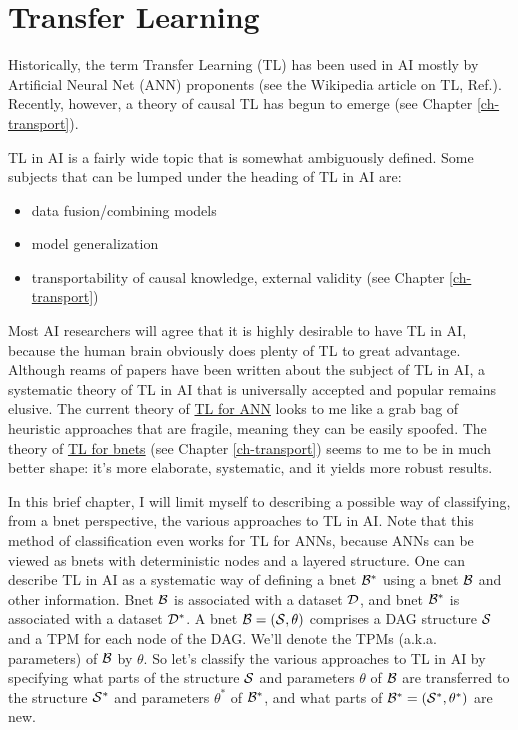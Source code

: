 \chapter{Transfer Learning}
\label{ch-transfer}

Historically,
the term Transfer Learning (TL)
has been used in AI mostly by Artificial Neural Net (ANN)
proponents (see the Wikipedia article on TL,
 Ref.\cite{wiki-TL}).
Recently, however,
 a theory of causal TL
has begun to emerge
(see Chapter \ref{ch-transport}).

TL in AI is a
fairly wide topic that 
is somewhat ambiguously defined.
Some subjects that can be lumped
under the heading of TL in AI are:
\begin{itemize}
\item data fusion/combining models
\item model generalization
\item transportability of 
causal knowledge, external validity
(see Chapter \ref{ch-transport})
\end{itemize}


Most AI researchers
will agree that it is highly desirable 
to have TL in AI, because the human 
brain obviously does  plenty of TL
to great advantage.
Although reams of papers 
have been written about the subject of TL in AI,
a systematic theory of TL in AI
that is universally accepted and popular
remains elusive. The current
theory of \ul{TL for ANN} looks to me 
like a grab bag
of
 heuristic approaches
that are fragile, meaning they
can be easily spoofed.
The theory of \ul{TL for bnets} (see
Chapter \ref{ch-transport})
seems to me to be in much 
better shape: it's more
elaborate,
systematic, and it
yields more robust results.



In this brief chapter, I will
limit myself to describing a possible way of
 classifying,
from a bnet perspective, the 
various approaches to TL
in AI.
Note that this method of classification
even works for TL for ANNs,
because ANNs can be
viewed as bnets with deterministic nodes
and a layered structure.
One can describe TL in AI as 
a systematic way 
of  defining a bnet 
${\cal B}^*$ 
using a bnet 
${\cal B}$
and other information.
Bnet ${\cal B}$ is associated with a dataset ${\cal D}$,
and bnet ${\cal B}^*$
is associated with a dataset ${\cal D}^*$.
A bnet ${\cal B}=({\cal S}, \theta)$ comprises
a DAG structure ${\cal S}$ and 
a TPM for each node of the DAG. We'll denote
the TPMs (a.k.a. parameters) of ${\cal B}$ by $\theta$. So let's
classify the various approaches to TL in AI 
by specifying what parts
of the structure ${\cal S}$ and parameters $\theta$
of ${\cal B}$
are transferred to the structure
${\cal S}^*$ and parameters $\theta^*$
of ${\cal B}^*$, and what parts of 
${\cal B}^*=({\cal S}^*, \theta^*)$ are new.

